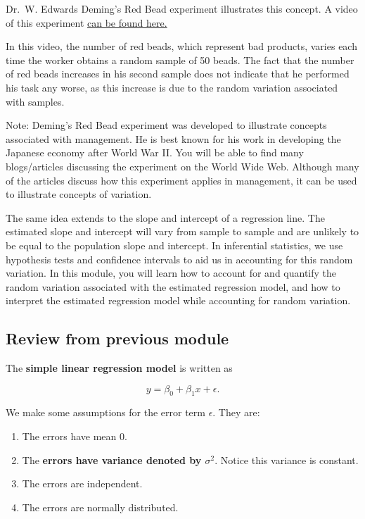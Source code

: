 \documentclass[
]{book}
\providecommand{\tightlist}{%
  \setlength{\itemsep}{0pt}\setlength{\parskip}{0pt}}
\begin{document}
Dr.~W. Edwards Deming's Red Bead experiment illustrates this concept. A video of this experiment \href{https://www.youtube.com/watch?v=R3ewHrpqclA}{can be found here.}

In this video, the number of red beads, which represent bad products, varies each time the worker obtains a random sample of 50 beads. The fact that the number of red beads increases in his second sample does not indicate that he performed his task any worse, as this increase is due to the random variation associated with samples.

Note: Deming's Red Bead experiment was developed to illustrate concepts associated with management. He is best known for his work in developing the Japanese economy after World War II. You will be able to find many blogs/articles discussing the experiment on the World Wide Web. Although many of the articles discuss how this experiment applies in management, it can be used to illustrate concepts of variation.

The same idea extends to the slope and intercept of a regression line. The estimated slope and intercept will vary from sample to sample and are unlikely to be equal to the population slope and intercept. In inferential statistics, we use hypothesis tests and confidence intervals to aid us in accounting for this random variation. In this module, you will learn how to account for and quantify the random variation associated with the estimated regression model, and how to interpret the estimated regression model while accounting for random variation.

\subsection{Review from previous module}\label{review-from-previous-module}

The \textbf{simple linear regression model} is written as

\begin{equation}
y=\beta_0+\beta_{1} x + \epsilon. 
\label{eq:4SLRmod}
\end{equation}

We make some assumptions for the error term \(\epsilon\). They are:

\begin{enumerate}
\def\labelenumi{\arabic{enumi}.}
\tightlist
\item
  The errors have mean 0.
\item
  The \textbf{errors have variance denoted by \(\sigma^2\)}. Notice this variance is constant.
\item
  The errors are independent.
\item
  The errors are normally distributed.
\end{enumerate}
\end{document}
